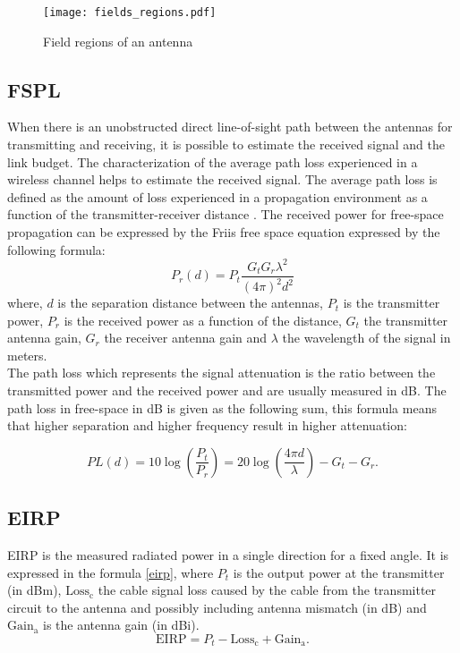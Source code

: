 %
\begin{figure}[H]
\centering
\texttt{[image: fields\_regions.pdf]}
\vspace{-12cm}\caption{\label{regions} Field regions of an antenna}
\end{figure}




\subsection{\acf{FSPL}}
When there is an unobstructed direct line-of-sight path between the antennas for transmitting and receiving, it is possible to estimate the received signal and the link budget. The characterization of the average path loss experienced in a wireless channel helps to estimate the received signal. The average path loss is defined as the amount of loss experienced in a propagation environment as a function of the transmitter-receiver distance \cite{schantz}. The received power for free-space propagation can be expressed by the Friis free space equation expressed by the following formula:
\begin{equation}
P_{r} \left( d \right) = P_{t}\frac{G_{t}G_{r} \lambda ^{2}}{ \left( 4 \pi  \right) ^{2}d^{2}} 
\end{equation}
where, $d$ is the separation distance between the antennas,  $P_{t}$ is the transmitter power, $P_{r}$ is the received power as a function of the distance, $G_{t}$ the transmitter antenna gain, $G_{r}$ the receiver antenna gain and $\lambda$ the wavelength of the signal in meters. \\

The path loss which represents the signal attenuation is the ratio between the transmitted power and the received power and are usually measured in dB. The path loss in free-space in dB is given as the following sum, this formula means that higher separation and higher frequency result in higher attenuation:

\begin{equation} 
PL \left( d \right) =10\log(\frac{P_{t}}{P_{r}})  =20\log \left( \frac{4 \pi d}{ \lambda } \right) -G_{t}-G_{r}.
\end{equation}

\subsection{\acf{EIRP}}
\acs{EIRP} is the measured radiated power in a single direction for a fixed angle. It is expressed in the formula \ref{eirp}, where $P_{t}$ is the output power at the transmitter (in dBm), $\mbox{Loss}_{\mbox{c}}$ the cable signal loss caused by the cable from the transmitter circuit to the antenna and possibly including antenna mismatch (in dB) and $\mbox{Gain}_{\mbox{a}}$ is the antenna gain (in dBi).
\begin{equation}
\mbox{EIRP} =  P_{t} - \mbox{Loss}_{\mbox{c}}+  \mbox{Gain}_{\mbox{a}}. \label{eirp}
\end{equation}
  
